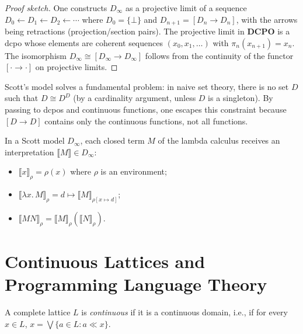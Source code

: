 \begin{proof}[Proof sketch]
One constructs $D_\infty$ as a projective limit of a sequence
$D_0 \leftarrow D_1 \leftarrow D_2 \leftarrow \cdots$ where $D_0 = \{\bot\}$ and
$D_{n+1} = [D_n \to D_n]$, with the arrows being retractions (projection/section pairs).
The projective limit in $\mathbf{DCPO}$ is a dcpo whose elements are coherent sequences
$(x_0, x_1, \ldots)$ with $\pi_n(x_{n+1}) = x_n$. The isomorphism
$D_\infty \cong [D_\infty \to D_\infty]$ follows from the continuity of the functor
$[\cdot \to \cdot]$ on projective limits.
\end{proof}

\begin{intuition}
Scott's model solves a fundamental problem: in naive set theory, there is no set $D$ such
that $D \cong D^D$ (by a cardinality argument, unless $D$ is a singleton). By passing to
dcpos and continuous functions, one escapes this constraint because $[D \to D]$ contains
only the continuous functions, not all functions.
\end{intuition}

\begin{definition}
In a Scott model $D_\infty$, each closed term $M$ of the lambda calculus receives an
interpretation $\llbracket M \rrbracket \in D_\infty$:
\begin{itemize}
  \item $\llbracket x \rrbracket_\rho = \rho(x)$ where $\rho$ is an environment;
  \item $\llbracket \lambda x.\, M \rrbracket_\rho = d \mapsto \llbracket M \rrbracket_{\rho[x \mapsto d]}$;
  \item $\llbracket M N \rrbracket_\rho = \llbracket M \rrbracket_\rho (\llbracket N \rrbracket_\rho)$.
\end{itemize}
\end{definition}

\section{Continuous Lattices and Programming Language Theory}

\begin{definition}
A complete lattice $L$ is \emph{continuous} if it is a continuous domain, i.e., if for
every $x \in L$, $x = \bigvee \{a \in L : a \ll x\}$.
\end{definition}


